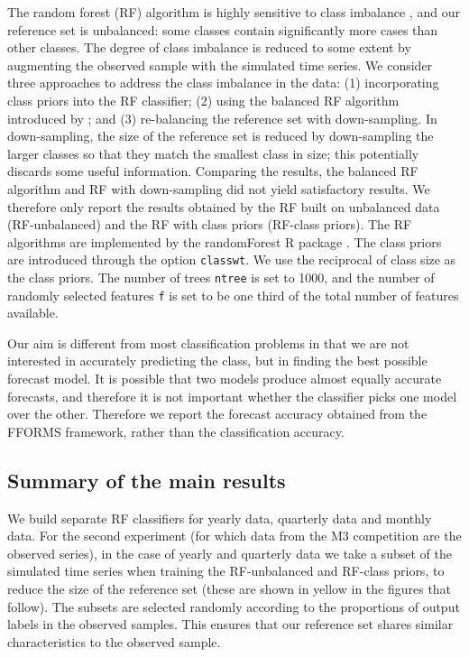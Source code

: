\documentclass[11pt,a4paper,]{article}
\begin{document}
The random forest (RF) algorithm is highly sensitive to class imbalance
\autocite{breiman2001random}, and our reference set is unbalanced: some
classes contain significantly more cases than other classes. The degree
of class imbalance is reduced to some extent by augmenting the observed
sample with the simulated time series. We consider three approaches to
address the class imbalance in the data: (1) incorporating class priors
into the RF classifier; (2) using the balanced RF algorithm introduced
by \textcite{chen2004using}; and (3) re-balancing the reference set with
down-sampling. In down-sampling, the size of the reference set is
reduced by down-sampling the larger classes so that they match the
smallest class in size; this potentially discards some useful
information. Comparing the results, the balanced RF algorithm and RF
with down-sampling did not yield satisfactory results. We therefore only
report the results obtained by the RF built on unbalanced data
(RF-unbalanced) and the RF with class priors (RF-class priors). The RF
algorithms are implemented by the randomForest R package
\autocites{liaw2002randomforest}{rfpkg}. The class priors are introduced
through the option \texttt{classwt}. We use the reciprocal of class size
as the class priors. The number of trees \texttt{ntree} is set to 1000,
and the number of randomly selected features \texttt{f} is set to be one
third of the total number of features available.

Our aim is different from most classification problems in that we are
not interested in accurately predicting the class, but in finding the
best possible forecast model. It is possible that two models produce
almost equally accurate forecasts, and therefore it is not important
whether the classifier picks one model over the other. Therefore we
report the forecast accuracy obtained from the FFORMS framework, rather
than the classification accuracy.

\subsection{Summary of the main results}\label{sec:results}

We build separate RF classifiers for yearly data, quarterly data and
monthly data. For the second experiment (for which data from the M3
competition are the observed series), in the case of yearly and
quarterly data we take a subset of the simulated time series when
training the RF-unbalanced and RF-class priors, to reduce the size of
the reference set (these are shown in yellow in the figures that
follow). The subsets are selected randomly according to the proportions
of output labels in the observed samples. This ensures that our
reference set shares similar characteristics to the observed sample.
\end{document}
